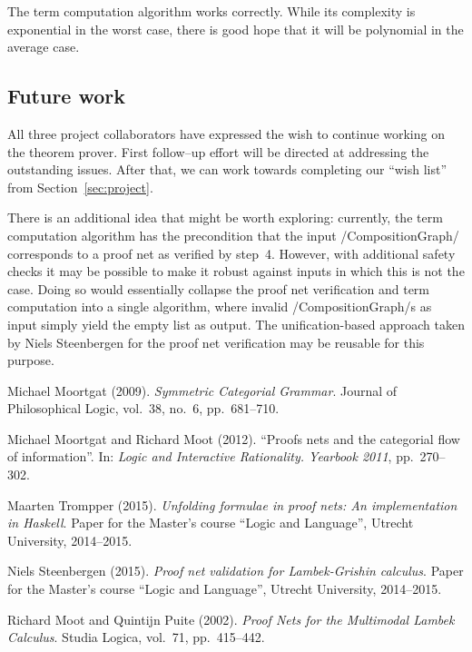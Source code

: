 \documentclass[12pt,a4paper]{article}
\begin{document}
The term computation algorithm works correctly. While its complexity is exponential in the worst case, there is good hope that it will be polynomial in the average case.


\subsection{Future work}

All three project collaborators have expressed the wish to continue working on the theorem prover. First follow--up effort will be directed at addressing the outstanding issues. After that, we can work towards completing our ``wish list'' from Section~\ref{sec:project}.

There is an additional idea that might be worth exploring: currently, the term computation algorithm has the precondition that the input \hs/CompositionGraph/ corresponds to a proof net as verified by step~4. However, with additional safety checks it may be possible to make it robust against inputs in which this is not the case. Doing so would essentially collapse the proof net verification and term computation into a single algorithm, where invalid \hs/CompositionGraph/s as input simply yield the empty list as output. The unification-based approach taken by Niels Steenbergen for the proof net verification \cite{niels} may be reusable for this purpose.


\begin{thebibliography}{9}
        Michael Moortgat (2009).
        \emph{Symmetric Categorial Grammar}.
        Journal of Philosophical Logic,
        vol.~38, no.~6, pp.~681--710.
    
        Michael Moortgat and Richard Moot (2012).
        ``Proofs nets and the categorial flow of information''.
        In: \emph{Logic and Interactive Rationality. Yearbook 2011},
        pp.~270--302.
    
        Maarten Trompper (2015).
        \emph{Unfolding formulae in proof nets: An implementation in Haskell}.
        Paper for the Master's course ``Logic and Language'',
        Utrecht University, 2014--2015.
    
        Niels Steenbergen (2015).
        \emph{Proof net validation for Lambek-Grishin calculus}.
        Paper for the Master's course ``Logic and Language'',
        Utrecht University, 2014--2015.
    
        Richard Moot and Quintijn Puite (2002).
        \emph{Proof Nets for the Multimodal Lambek Calculus}.
        Studia Logica, vol.~71, pp.~415--442.
\end{thebibliography}
\end{document}
